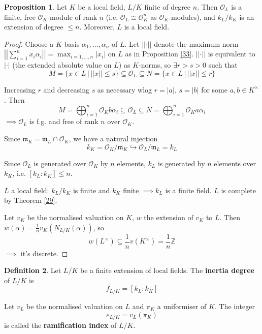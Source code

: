 \documentclass[a4paper]{article}
\theoremstyle{definition}
\newtheorem{definition}{Definition}
\theoremstyle{default}
\newtheorem{prop}[definition]{Proposition}
\theoremstyle{remark}
\newcommand*\abs[1]{\left|#1\right|}
\newcommand*\norm[1]{\abs{\abs{#1}}}
\begin{document}
\begin{prop}
	Let $K$ be a local field,
	$L/K$ finite of degree $n$.
	Then $\mathcal{O}_L$ is a finite, free $\mathcal{O}_K$-module of rank $n$
	(i.e. $\mathcal{O}_L \cong \mathcal{O}_K^n$ as $\mathcal{O}_K$-modules),
	and $k_L/k_K$ is an extension of degree $\leq n$.
	Moreover, $L$ is a local field.
\end{prop}
\begin{proof}
	Choose a $K$-basis $\alpha_1, \dots, \alpha_n$ of $L$.
	Let $\norm{\cdot}$ denote the maximum norm $\norm{\sum_{i=1}^n x_i \alpha_i} = \max_{i=1,\dots,n}\abs{x_i}$
	on $L$ as in Proposition \ref{33}.
	$\norm{\cdot}$ is equivalent to $\abs{\cdot}$ (the extended absolute value on $L$) as $K$-norms,
	so $\exists r > s > 0$ such that
	$$M = \{x \in L \,|\, \norm{x} \leq s \} \subseteq \mathcal{O}_L \subseteq N = \{x \in L \,|\, \norm{x} \leq r\}$$
	
	Increasing $r$ and decreasing $s$ as necessary wlog $r=\abs{a}$, $s=\abs{b}$ for some $a,b \in K^\times$. Then
	$$M = \bigoplus_{i=1}^n \mathcal{O}_K b\alpha_i \subseteq \mathcal{O}_L \subseteq N = \bigoplus_{i=1}^n \mathcal{O}_K a \alpha_i$$
	$\implies \mathcal{O}_L$ is f.g. and free of rank $n$ over $\mathcal{O}_K$.
	
	Since $\mathfrak{m}_K = \mathfrak{m}_L \cap \mathcal{O}_K$,
	we have a natural injection
	$$k_K = \mathcal{O}_K/\mathfrak{m}_K \hookrightarrow \mathcal{O}_L/\mathfrak{m}_L = k_L$$
	
	Since $\mathcal{O}_L$ is generated over $\mathcal{O}_K$ by $n$ elements,
	$k_L$ is generated by $n$ elements over $k_K$,
	i.e. $[k_L:k_K] \leq n$.
	
	$L$ a local field: $k_L/k_K$ is finite and $k_K$ finite $\implies k_L$ is a finite field.
	$L$ is complete by Theorem \ref{29}.
	
	Let $v_K$ be the normalised valuation on $K$,
	$w$ the extension of $v_K$ to $L$.
	Then $w(\alpha) = \frac{1}{n} v_K (N_{L/K}(\alpha))$, so
	$$w(L^\times) \subseteq \frac{1}{n}v(K^\times) = \frac{1}{n}\mathbb{Z}$$
	$\implies$ it's discrete.
\end{proof}

\begin{definition}
	Let $L/K$ be a finite extension of local fields.
	The \textbf{inertia degree} of $L/K$ is
	$$f_{L/K} = [k_L:k_K]$$
	
	Let $v_L$ be the normalised valuation on $L$ and $\pi_K$ a uniformiser of $K$.
	The integer
	$$e_{L/K} = v_L(\pi_K)$$
	is called the \textbf{ramification index} of $L/K$.
\end{definition}
\end{document}
